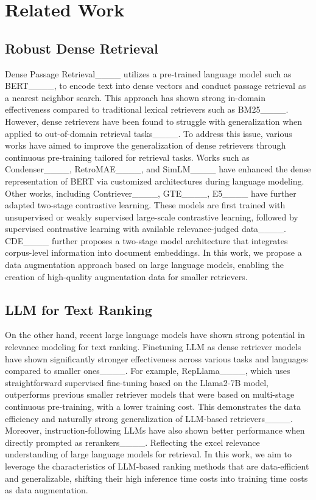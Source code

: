 \section{Related Work}
\subsection{Robust Dense Retrieval}
Dense Passage Retrieval____ utilizes a pre-trained language model such as BERT____, to encode text into dense vectors and conduct passage retrieval as a nearest neighbor search.
This approach has shown strong in-domain effectiveness compared to traditional lexical retrievers such as BM25____.
However, dense retrievers have been found to struggle with generalization when applied to out-of-domain retrieval tasks____.
To address this issue, various works have aimed to improve the generalization of dense retrievers through continuous pre-training tailored for retrieval tasks.
Works such as Condenser____, RetroMAE____, and SimLM____ have enhanced the dense representation of BERT via customized architectures during language modeling.
Other works, including Contriever____, GTE____, E5____ have further adapted two-stage contrastive learning.
These models are first trained with unsupervised or weakly supervised large-scale contrastive learning, followed by supervised contrastive learning with available relevance-judged data____.
CDE____ further proposes a two-stage model architecture that integrates corpus-level information into document embeddings.
In this work, we propose a data augmentation approach based on large language models, enabling the creation of high-quality augmentation data for smaller retrievers.

\subsection{LLM for Text Ranking}
On the other hand, recent large language models have shown strong potential in relevance modeling for text ranking.
Finetuning LLM as dense retriever models have shown significantly stronger effectiveness across various tasks and languages compared to smaller ones____.
For example, RepLlama____, which uses straightforward supervised fine-tuning based on the Llama2-7B model, outperforms previous smaller retriever models that were based on multi-stage continuous pre-training, with a lower training cost.
This demonstrates the data efficiency and naturally strong generalization of LLM-based retrievers____.
Moreover, instruction-following LLMs have also shown better performance when directly prompted as rerankers____.
Reflecting the excel relevance understanding of large language models for retrieval.
In this work, we aim to leverage the characteristics of LLM-based ranking methods that are data-efficient and generalizable, shifting their high inference time costs into training time costs as data augmentation.


